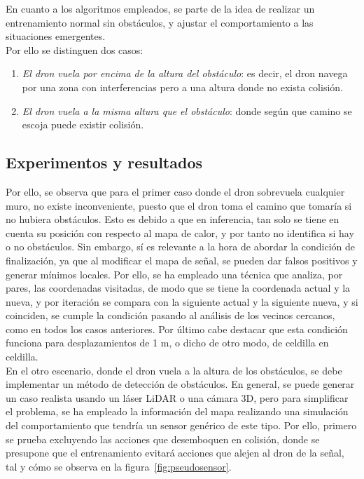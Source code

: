 En cuanto a los algoritmos empleados, se parte de la idea de realizar un entrenamiento normal sin obstáculos, y ajustar el comportamiento a las situaciones emergentes.\\

Por ello se distinguen dos casos:

\begin{enumerate}
    \item \emph{El dron vuela por encima de la altura del obstáculo}: es decir, el dron navega por una zona con interferencias pero a una altura donde no exista colisión.

    \item \emph{El dron vuela a la misma altura que el obstáculo}: donde según que camino se escoja puede existir colisión.
\end{enumerate}

\subsection{Experimentos y resultados}
\label{subsec:experimentos_sfo}

Por ello, se observa que para el primer caso donde el dron sobrevuela cualquier muro, no existe inconveniente, puesto que el dron toma el camino que tomaría si no hubiera obstáculos. Esto es debido a que en inferencia, tan solo se tiene en cuenta su posición con respecto al mapa de calor, y por tanto no identifica si hay o no obstáculos. Sin embargo, sí es relevante a la hora de abordar la condición de finalización, ya que al modificar el mapa de señal, se pueden dar falsos positivos y generar mínimos locales. Por ello, se ha empleado una técnica que analiza, por pares, las coordenadas visitadas, de modo que se tiene la coordenada actual y la nueva, y por iteración se compara con la siguiente actual y la siguiente nueva, y si coinciden, se cumple la condición pasando al análisis de los vecinos cercanos, como en todos los casos anteriores. Por último cabe destacar que esta condición funciona para desplazamientos de 1 m, o dicho de otro modo, de celdilla en celdilla.\\

En el otro escenario, donde el dron vuela a la altura de los obstáculos, se debe implementar un método de detección de obstáculos. En general, se puede generar un caso realista usando un láser LiDAR o una cámara 3D, pero para simplificar el problema, se ha empleado la información del mapa realizando una simulación del comportamiento que tendría un sensor genérico de este tipo. Por ello, primero se prueba excluyendo las acciones que desemboquen en colisión, donde se presupone que el entrenamiento evitará acciones que alejen al dron de la señal, tal y cómo se observa en la figura~\ref{fig:pseudosensor}.\\

